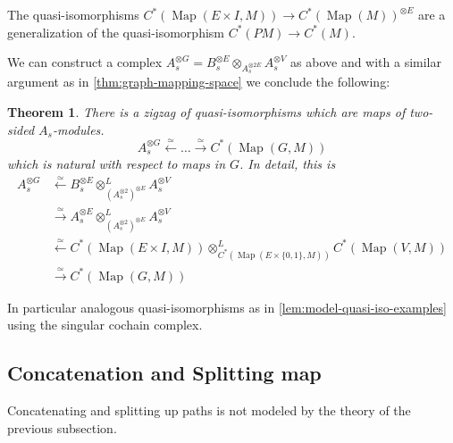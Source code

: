 \documentclass{scrartcl}
\theoremstyle{plain}
\newtheorem{theorem}{Theorem}[section]
\theoremstyle{definition}
\newcommand{\quiso}{\simeq}
\newcommand{\from}{\leftarrow}
\let\xto\xrightarrow
\let\xfrom\xleftarrow
\DeclareMathOperator{\Map}{Map}
\begin{document}
The quasi-isomorphisms $C^*(\Map(E\times I, M)) \to C^*(\Map(M))^{\otimes E}$ are a generalization of the quasi-isomorphism $C^*(PM)\to C^*(M)$. 

We can construct a complex $A_s^{\otimes G} = B_s^{\otimes E} \otimes_{A_s^{\otimes 2E}} A_s^{\otimes V}$ as above and with a similar argument as in \cref{thm:graph-mapping-space} we conclude the following:
\begin{theorem}
    There is a zigzag of quasi-isomorphisms which are maps of two-sided $A_s$-modules.
    $$A_s^{\otimes G} \xfrom{\quiso} \dots \xto{\quiso} C^*(\Map(G, M))$$
    which is natural with respect to maps in $G$. In detail, this is
        \begin{align*}
            A_s^{\otimes G} &\xfrom{\quiso} B_s^{\otimes E} \otimes^L_{(A_s^{\otimes 2})^{\otimes E}} A_s^{\otimes V} \\&\xto{\quiso} A_s^{\otimes E} \otimes^L_{(A_s^{\otimes 2})^{\otimes E}} A_s^{\otimes V}\\ &\xfrom{\quiso} C^*(\Map(E\times I, M))\otimes^L_{C^*(\Map(E\times \{0, 1\}, M))} C^*(\Map(V, M)) \\&\xto{\quiso} C^*(\Map(G, M))
        \end{align*}
\end{theorem}

In particular analogous quasi-isomorphisms as in \cref{lem:model-quasi-iso-examples} using the singular cochain complex. 


\subsection{Concatenation and Splitting map}\label{subsec:model-concatenation} 
Concatenating and splitting up paths is not modeled by the theory of the previous subsection. 
\end{document}
